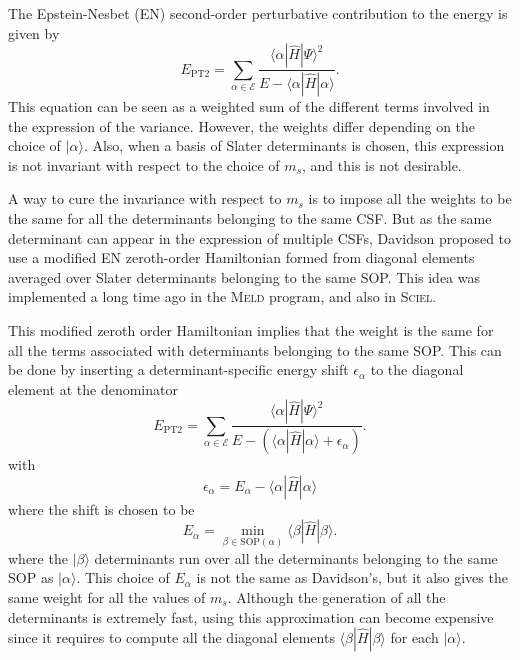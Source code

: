 \documentclass[aip,jcp,reprint,showkeys]{revtex4-1}
\newcommand{\ket}[1]{|#1\rangle}
\newcommand{\sop}{SOP}
\newcommand{\csf}{CSF}
\newcommand{\mel}[3]{\langle #1 | #2 | #3 \rangle}
\newcommand{\ept}{E_\text{PT2}}
\begin{document}
The Epstein-Nesbet (EN) second-order perturbative contribution to the energy is given
by
\begin{equation}
\ept = \sum_{\alpha \in \mathcal{E}} \frac{\mel{\alpha}{\hat{H}}{\Psi}^2}{E-\mel{\alpha}{\hat{H}}{\alpha}}.
\label{eq:pt2}
\end{equation}
This equation can be seen as a weighted sum of the different terms involved in
the expression of the variance. However, the weights differ depending on the
choice of $\ket{\alpha}$. Also, when a basis of Slater determinants is chosen,
this expression is not invariant with respect to the choice of $m_s$, and this 
is not desirable.

A way to cure the invariance with respect to $m_s$ is to impose all the weights
to be the same for all the determinants belonging to the same {\csf}. But as 
the same determinant can appear in the expression of multiple {\csf s}, Davidson
proposed to use a modified EN zeroth-order Hamiltonian formed from
diagonal elements averaged over Slater determinants belonging to the same
{\sop}. This idea was implemented a long time ago in the \textsc{Meld} 
program,\cite{Davidson_1979,Kozlowski_1994} and also in \textsc{Sciel}.\cite{Sciel}

This modified zeroth order Hamiltonian implies that the weight is the same for
all the terms associated with determinants belonging to the same {\sop}. This can be done by
inserting a determinant-specific energy shift $\epsilon_\alpha$ to the
diagonal element at the denominator 
\begin{equation}
\ept = \sum_{\alpha \in \mathcal{E}} \frac{\mel{\alpha}{\hat{H}}{\Psi}^2}{E-\left(\mel{\alpha}{\hat{H}}{\alpha}+\epsilon_\alpha \right)}.
\end{equation}
with
\begin{equation}
\epsilon_\alpha = E_\alpha - \mel{\alpha}{\hat{H}}{\alpha} 
\end{equation}
where the shift is chosen to be
\begin{equation}
E_\alpha = \min_{\beta \in \text{\sop}(\alpha)} \mel{\beta}{\hat{H}}{\beta}.
\end{equation}
where the $\ket{\beta}$ determinants run over all the determinants belonging to the
same {\sop} as $\ket{\alpha}$.
This choice of $E_\alpha$ is not the same as Davidson's, but it also
gives the same weight for all the values of $m_s$.
Although the generation of all the determinants is extremely fast, using
this approximation can become expensive since it requires to compute
all the diagonal elements $\mel{\beta}{\hat{H}}{\beta}$ for each
$\ket{\alpha}$.
\end{document}
